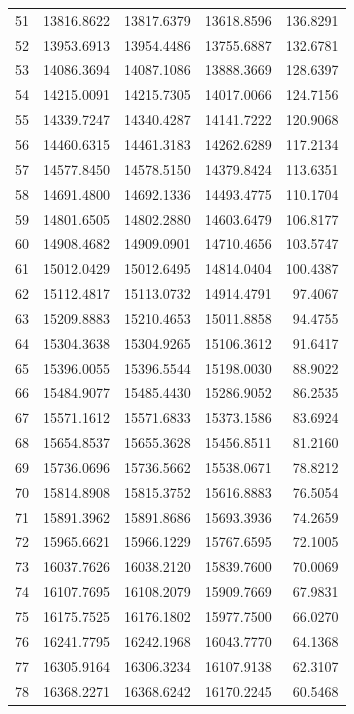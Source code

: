 \documentclass[11pt]{article}
\begin{document}
\begin{longtable}{r r r r r}
51 & 13816.8622 & 13817.6379 & 13618.8596 & 136.8291 \\
52 & 13953.6913 & 13954.4486 & 13755.6887 & 132.6781 \\
53 & 14086.3694 & 14087.1086 & 13888.3669 & 128.6397 \\
54 & 14215.0091 & 14215.7305 & 14017.0066 & 124.7156 \\
55 & 14339.7247 & 14340.4287 & 14141.7222 & 120.9068 \\
56 & 14460.6315 & 14461.3183 & 14262.6289 & 117.2134 \\
57 & 14577.8450 & 14578.5150 & 14379.8424 & 113.6351 \\
58 & 14691.4800 & 14692.1336 & 14493.4775 & 110.1704 \\
59 & 14801.6505 & 14802.2880 & 14603.6479 & 106.8177 \\
60 & 14908.4682 & 14909.0901 & 14710.4656 & 103.5747 \\
61 & 15012.0429 & 15012.6495 & 14814.0404 & 100.4387 \\
62 & 15112.4817 & 15113.0732 & 14914.4791 & 97.4067 \\
63 & 15209.8883 & 15210.4653 & 15011.8858 & 94.4755 \\
64 & 15304.3638 & 15304.9265 & 15106.3612 & 91.6417 \\
65 & 15396.0055 & 15396.5544 & 15198.0030 & 88.9022 \\
66 & 15484.9077 & 15485.4430 & 15286.9052 & 86.2535 \\
67 & 15571.1612 & 15571.6833 & 15373.1586 & 83.6924 \\
68 & 15654.8537 & 15655.3628 & 15456.8511 & 81.2160 \\
69 & 15736.0696 & 15736.5662 & 15538.0671 & 78.8212 \\
70 & 15814.8908 & 15815.3752 & 15616.8883 & 76.5054 \\
71 & 15891.3962 & 15891.8686 & 15693.3936 & 74.2659 \\
72 & 15965.6621 & 15966.1229 & 15767.6595 & 72.1005 \\
73 & 16037.7626 & 16038.2120 & 15839.7600 & 70.0069 \\
74 & 16107.7695 & 16108.2079 & 15909.7669 & 67.9831 \\
75 & 16175.7525 & 16176.1802 & 15977.7500 & 66.0270 \\
76 & 16241.7795 & 16242.1968 & 16043.7770 & 64.1368 \\
77 & 16305.9164 & 16306.3234 & 16107.9138 & 62.3107 \\
78 & 16368.2271 & 16368.6242 & 16170.2245 & 60.5468 \\

\end{longtable}
\end{document}
